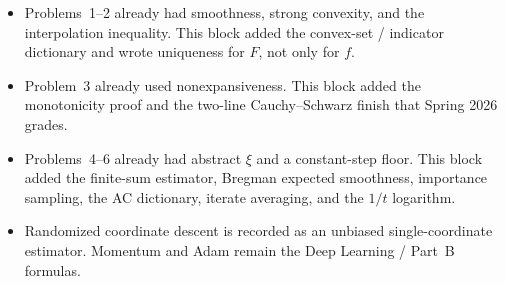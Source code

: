 \begin{summary}
\label{sum:optu}
\begin{itemize}
    \item Problems~1--2 already had smoothness, strong convexity, and the interpolation inequality. This block added the convex-set / indicator dictionary and wrote uniqueness for $F$, not only for $f$.
    \item Problem~3 already used nonexpansiveness. This block added the monotonicity proof and the two-line Cauchy--Schwarz finish that Spring 2026 grades.
    \item Problems~4--6 already had abstract $\xi$ and a constant-step floor. This block added the finite-sum estimator, Bregman expected smoothness, importance sampling, the AC dictionary, iterate averaging, and the $1/t$ logarithm.
    \item Randomized coordinate descent is recorded as an unbiased single-coordinate estimator. Momentum and Adam remain the Deep Learning / Part~B formulas.
\end{itemize}
\end{summary}

